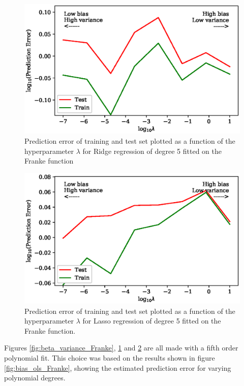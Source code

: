 \documentclass[a4paper, 10pt]{article}
\begin{document}
\begin{figure}[H]
    \includegraphics{figs/biasvariancetradeoff_Ridge_Franke.eps}
    \caption{Prediction error of training and test set plotted as a function of the hyperparameter $\lambda$ for Ridge regression of degree 5 fitted on the Franke function}
    \label{fig:bias_ridge_Franke}
\end{figure}

\begin{figure}[H]
    \includegraphics{figs/biasvariancetradeoff_LASSO_Franke.eps}
    \caption{Prediction error of training and test set plotted as a function of the hyperparameter $\lambda$ for Lasso regression of degree 5 fitted on the Franke function.}
    \label{fig:bias_lasso_Franke}
\end{figure}
Figures \ref{fig:beta_variance_Franke}, \ref{fig:bias_ridge_Franke} and \ref{fig:bias_lasso_Franke} are all made with a fifth order polynomial fit. This choice was based on the results shown in figure \ref{fig:bias_ols_Franke}, showing the estimated prediction error for varying polynomial degrees.
\end{document}
